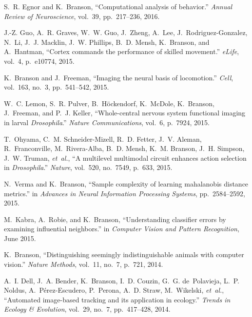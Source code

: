 \begin{cvenum}
\item S.~R. Egnor and K.~Branson, ``Computational analysis of behavior.'' {\em Annual
  Review of Neuroscience}, vol.~39, pp.~217--236, 2016.

\item J.-Z. Guo, A.~R. Graves, W.~W. Guo, J.~Zheng, A.~Lee,
  J.~Rodriguez-Gonzalez, N.~Li, J.~J. Macklin, J.~W. Phillips, B.~D. Mensh,
  K.~Branson, and A.~Hantman, ``Cortex commands the performance of skilled
  movement.'' {\em e{L}ife}, vol.~4, p.~e10774, 2015.

\item K.~Branson and J.~Freeman, ``Imaging the neural basis of locomotion.'' {\em
  Cell}, vol.~163, no.~3, pp.~541--542, 2015.

\item W.~C. Lemon, S.~R. Pulver, B.~H{\"o}ckendorf, K.~McDole, K.~Branson,
  J.~Freeman, and P.~J. Keller, ``Whole-central nervous system functional
  imaging in larval {\em {{D}}rosophila}.'' {\em Nature Communications}, vol.~6, p.~7924,
  2015.

\item T.~Ohyama, C.~M. Schneider-Mizell, R.~D. Fetter, J.~V. Aleman, R.~Franconville, M.~Rivera-Alba, B.~D. Mensh, K.~M. Branson, J.~H. Simpson, J.~W. Truman, {\em et~al.}, ``A multilevel multimodal circuit enhances action selection in {\em {{D}}rosophila}.'' {\em Nature}, vol.~520, no.~7549, p.~633, 2015.

\item N.~Verma and K.~Branson, ``Sample complexity of learning mahalanobis distance metrics.'' in {\em Advances in Neural Information Processing Systems}, pp.~2584--2592, 2015.

\item M.~Kabra, A.~Robie, and K.~Branson, ``Understanding classifier errors by
  examining influential neighbors.'' in {\em Computer Vision and Pattern
  Recognition}, June 2015.

\item K.~Branson, ``Distinguishing seemingly indistinguishable animals with computer
  vision.'' {\em Nature Methods}, vol.~11, no.~7, p.~721, 2014.

\item A.~I. Dell, J.~A. Bender, K.~Branson, I.~D. Couzin, G.~G. de~Polavieja, L.~P.
  Noldus, A.~P{\'e}rez-Escudero, P.~Perona, A.~D. Straw, M.~Wikelski, {\em
  et~al.}, ``Automated image-based tracking and its application in ecology.''
  {\em Trends in Ecology \& Evolution}, vol.~29, no.~7, pp.~417--428, 2014.


\end{cvenum}
